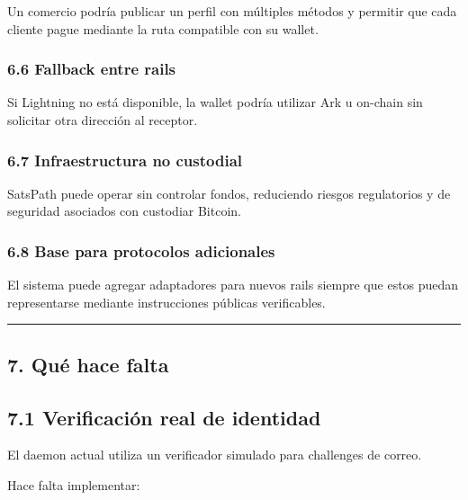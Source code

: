 \documentclass[
]{article}
\begin{document}
Un comercio podría publicar un perfil con múltiples métodos y permitir
que cada cliente pague mediante la ruta compatible con su wallet.

\hypertarget{fallback-entre-rails}{%
\subsubsection{6.6 Fallback entre rails}\label{fallback-entre-rails}}

Si Lightning no está disponible, la wallet podría utilizar Ark u
on-chain sin solicitar otra dirección al receptor.

\hypertarget{infraestructura-no-custodial}{%
\subsubsection{6.7 Infraestructura no
custodial}\label{infraestructura-no-custodial}}

SatsPath puede operar sin controlar fondos, reduciendo riesgos
regulatorios y de seguridad asociados con custodiar Bitcoin.

\hypertarget{base-para-protocolos-adicionales}{%
\subsubsection{6.8 Base para protocolos
adicionales}\label{base-para-protocolos-adicionales}}

El sistema puede agregar adaptadores para nuevos rails siempre que estos
puedan representarse mediante instrucciones públicas verificables.

\begin{center}\rule{0.5\linewidth}{0.5pt}\end{center}

\hypertarget{quuxe9-hace-falta}{%
\subsection{7. Qué hace falta}\label{quuxe9-hace-falta}}

\hypertarget{verificaciuxf3n-real-de-identidad}{%
\subsection{7.1 Verificación real de
identidad}\label{verificaciuxf3n-real-de-identidad}}

El daemon actual utiliza un verificador simulado para challenges de
correo.

Hace falta implementar:
\end{document}
